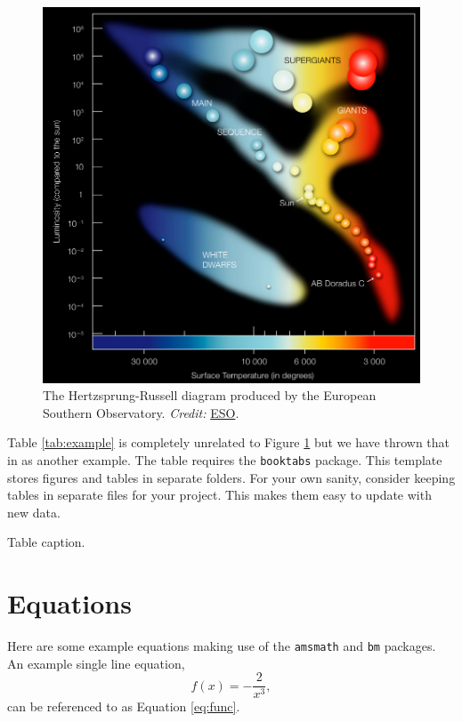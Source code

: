 \begin{figure}[t]
  \centering
  \includegraphics{figures/example.pdf}
  \caption[Short version of caption]{The Hertzsprung-Russell diagram produced by the European Southern Observatory. \emph{Credit:} \href{https://www.eso.org/public/images/eso0728c/}{ESO}.}
  \label{fig:example}
\end{figure}

Table \ref{tab:example} is completely unrelated to Figure \ref{fig:example} but we have thrown that in as another example. The table requires the \texttt{booktabs} package. This template stores figures and tables in separate folders. For your own sanity, consider keeping tables in separate files for your project. This makes them easy to update with new data.

\begin{table}
  \centering
  \caption[Short version of caption]{Table caption.}
  \label{tab:example}
  
\end{table}

\section{Equations}

Here are some example equations making use of the \texttt{amsmath} and \texttt{bm} packages. An example single line equation,
%
\begin{equation}
  f(x) = - \frac{2}{x^3},\label{eq:func}
\end{equation}
%
can be referenced to as Equation \ref{eq:func}. 

